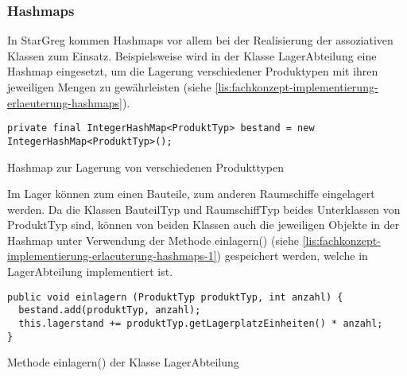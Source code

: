 \subsubsection{Hashmaps}
\label{subsub:fachkonzept-implementierung-erlaeuterung-hashmaps}

In StarGreg kommen Hashmaps vor allem bei der Realisierung der assoziativen Klassen zum Einsatz. Beispielsweise wird in der Klasse LagerAbteilung eine Hashmap eingesetzt, um die Lagerung verschiedener Produktypen mit ihren jeweiligen Mengen zu gewährleisten (siehe \ref{lis:fachkonzept-implementierung-erlaeuterung-hashmaps}).

\begin{programm}[htb]
\begin{lstlisting}[breaklines=true]
private final IntegerHashMap<ProduktTyp> bestand = new IntegerHashMap<ProduktTyp>();
\end{lstlisting}
\caption{Hashmap zur Lagerung von verschiedenen Produkttypen}
\label{lis:fachkonzept-implementierung-erlaeuterung-hashmaps}
\end{programm}

Im Lager können zum einen Bauteile, zum anderen Raumschiffe eingelagert werden. Da die Klassen BauteilTyp und RaumschiffTyp beides Unterklassen von ProduktTyp sind, können von beiden Klassen auch die jeweiligen Objekte in der Hashmap unter Verwendung der Methode einlagern() (siehe \ref{lis:fachkonzept-implementierung-erlaeuterung-hashmaps-1}) gespeichert werden, welche in LagerAbteilung implementiert ist.

\begin{programm}[htb]
\begin{lstlisting}[breaklines=true]
public void einlagern (ProduktTyp produktTyp, int anzahl) {
  bestand.add(produktTyp, anzahl);
  this.lagerstand += produktTyp.getLagerplatzEinheiten() * anzahl;
}
\end{lstlisting}
\caption{Methode einlagern() der Klasse LagerAbteilung}
\label{lis:fachkonzept-implementierung-erlaeuterung-hashmaps-1}
\end{programm}